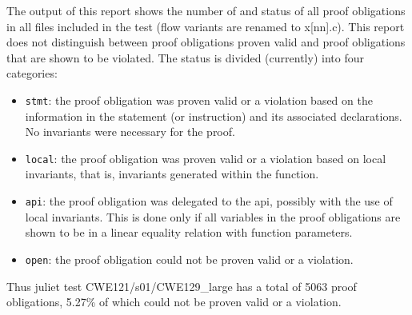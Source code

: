 \documentclass[11pt]{article}
\begin{document}
The output of this report shows the number of and status of all proof obligations
in all files included in the test (flow variants are renamed to x[nn].c). This report
does not distinguish between proof obligations proven valid and proof obligations
that are shown to be violated. The status
is divided (currently) into four categories:
\begin{itemize}
\item {\tt stmt}: the proof obligation was proven valid or a violation based on the
   information in the statement (or instruction) and its associated declarations.
   No invariants were necessary for the proof.
\item {\tt local}: the proof obligation was proven valid or a violation based on 
   local invariants, that is, invariants generated within the function.
\item {\tt api}: the proof obligation was delegated to the api, possibly with the use
   of local invariants. This is done only if all variables in the proof obligations
   are shown to be in a linear equality relation with function parameters.
\item {\tt open}: the proof obligation could not be proven valid or a violation.
\end{itemize}
Thus juliet test CWE121/s01/CWE129\_large has a total of 5063 proof obligations, 5.27\%
of which could not be proven valid or a violation.
\end{document}

